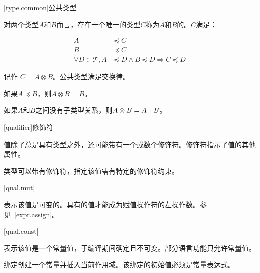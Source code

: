 [type.common]{公共类型}

\pnum
对两个类型$A$和$B$而言，存在一个唯一的类型$C$称为$A$和$B$的。$C$满足：

\begin{equation}
\begin{aligned}
    A &\preceq C \\
    B &\preceq C \\
    \forall D \in \mathcal{T}, A &\preceq D \land B \preceq D \Rightarrow C \preceq D
\end{aligned}
\end{equation}

记作 $C = A \otimes B$。公共类型满足交换律。

\pnum
如果$A \preceq B$，则$A \otimes B = B$。

\pnum
如果$A$和$B$之间没有子类型关系，则$A \otimes B = A \mathbin{\texttt{|}} B$。

[qualifier]{修饰符}

\pnum
值除了总是具有类型之外，还可能带有一个或数个修饰符。修饰符指示了值的其他属性。

\pnum
类型可以带有修饰符，指定该值需有特定的修饰符约束。

[qual.mut]{}

\pnum
{}表示该值是可变的。具有的值才能成为赋值操作符的左操作数。参见~\ref{expr.assign}。

[qual.const]{}

\pnum
{}表示该值是一个常量值，于编译期间确定且不可变。部分语言功能只允许常量值。

\pnum
{}绑定创建一个常量并插入当前作用域。该绑定的初始值必须是常量表达式。
